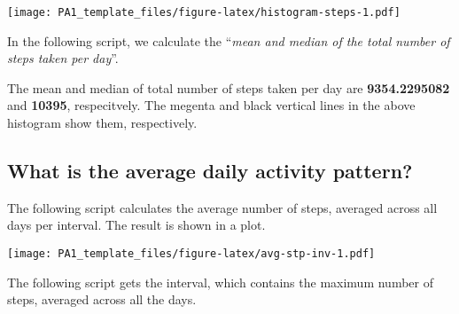 \documentclass[]{article}
\newenvironment{Shaded}{\begin{snugshade}}{\end{snugshade}}
\newcommand{\KeywordTok}[1]{\textcolor[rgb]{0.13,0.29,0.53}{\textbf{#1}}}
\newcommand{\DataTypeTok}[1]{\textcolor[rgb]{0.13,0.29,0.53}{#1}}
\newcommand{\StringTok}[1]{\textcolor[rgb]{0.31,0.60,0.02}{#1}}
\newcommand{\OtherTok}[1]{\textcolor[rgb]{0.56,0.35,0.01}{#1}}
\newcommand{\OperatorTok}[1]{\textcolor[rgb]{0.81,0.36,0.00}{\textbf{#1}}}
\newcommand{\NormalTok}[1]{#1}
\begin{document}
\texttt{[image: PA1\_template\_files/figure-latex/histogram-steps-1.pdf]}

In the following script, we calculate the ``\emph{mean and median of the
total number of steps taken per day}''.

\begin{Shaded}
\end{Shaded}

The mean and median of total number of steps taken per day are
\textbf{9354.2295082} and \textbf{10395}, respecitvely. The megenta and
black vertical lines in the above histogram show them, respectively.

\subsection{What is the average daily activity
pattern?}\label{what-is-the-average-daily-activity-pattern}

The following script calculates the average number of steps, averaged
across all days per interval. The result is shown in a plot.

\begin{Shaded}
\end{Shaded}

\texttt{[image: PA1\_template\_files/figure-latex/avg-stp-inv-1.pdf]}

The following script gets the interval, which contains the maximum
number of steps, averaged across all the days.

\begin{Shaded}
\end{Shaded}
\end{document}
